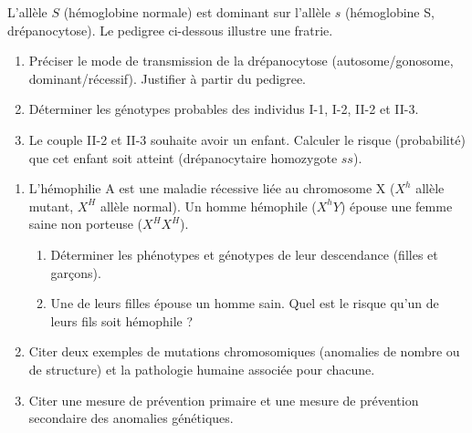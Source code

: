 \documentclass[11pt]{article}
\begin{document}
\begin{exercice}
L'allèle $S$ (hémoglobine normale) est dominant sur l'allèle $s$ (hémoglobine S, drépanocytose). Le pedigree ci-dessous illustre une fratrie.
\begin{center}
\end{center}
\begin{enumerate}
    \item Préciser le mode de transmission de la drépanocytose (autosome/gonosome, dominant/récessif). Justifier à partir du pedigree.
    \item Déterminer les génotypes probables des individus I-1, I-2, II-2 et II-3.
    \item Le couple II-2 et II-3 souhaite avoir un enfant. Calculer le risque (probabilité) que cet enfant soit atteint (drépanocytaire homozygote $ss$).
\end{enumerate}
\end{exercice}

\begin{exercice}
\begin{enumerate}
    \item L'hémophilie A est une maladie récessive liée au chromosome X ($X^h$ allèle mutant, $X^H$ allèle normal). Un homme hémophile ($X^hY$) épouse une femme saine non porteuse ($X^HX^H$).
    \begin{enumerate}
        \item Déterminer les phénotypes et génotypes de leur descendance (filles et garçons).
        \item Une de leurs filles épouse un homme sain. Quel est le risque qu'un de leurs fils soit hémophile ?
    \end{enumerate}
    \item Citer deux exemples de mutations chromosomiques (anomalies de nombre ou de structure) et la pathologie humaine associée pour chacune.
    \item Citer une mesure de prévention primaire et une mesure de prévention secondaire des anomalies génétiques.
\end{enumerate}
\end{exercice}
\end{document}
